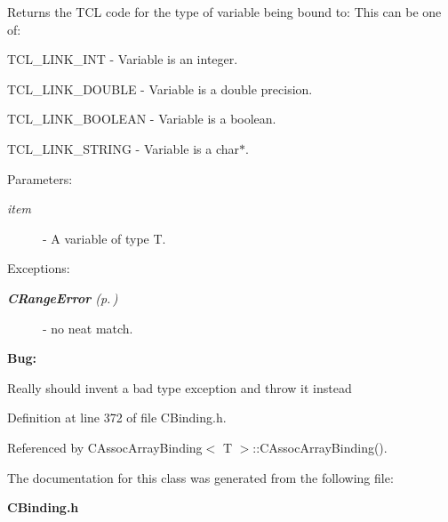 Returns the TCL code for the type of variable being bound to: This can be one of:\begin{CompactItemize}
\item 
TCL\_\-LINK\_\-INT - Variable is an integer.\item 
TCL\_\-LINK\_\-DOUBLE - Variable is a double precision.\item 
TCL\_\-LINK\_\-BOOLEAN - Variable is a boolean.\item 
TCL\_\-LINK\_\-STRING - Variable is a char$\ast$.\end{CompactItemize}
\begin{Desc}
\item[Parameters: ]\par
\begin{description}
\item[{\em 
item}]- A variable of type T.\end{description}
\end{Desc}
\begin{Desc}
\item[Exceptions: ]\par
\begin{description}
\item[{\em 
{\bf CRange\-Error} {\rm (p.\,\pageref{classCRangeError})}}] - no neat match.\end{description}
\end{Desc}


\begin{Desc}
\item[{\bf Bug: }]\par
Really should invent a bad type exception and throw it instead\end{Desc}
 

Definition at line 372 of file CBinding.h.

Referenced by CAssoc\-Array\-Binding$<$ T $>$::CAssoc\-Array\-Binding().

The documentation for this class was generated from the following file:\begin{CompactItemize}
\item 
{\bf CBinding.h}\end{CompactItemize}

